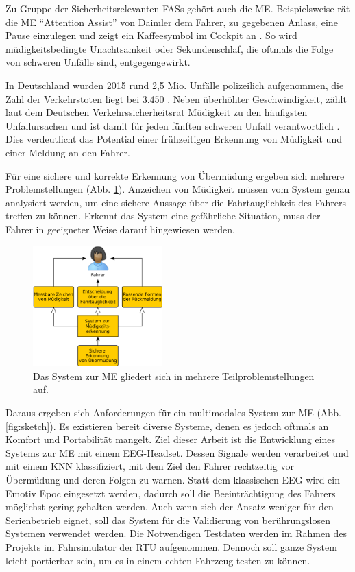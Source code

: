 {Zu Gruppe der Sicherheitsrelevanten \acl{FASs} gehört auch die \acl{ME}. Beispielsweise rät die \acl{ME} "`Attention Assist"' von Daimler dem Fahrer, zu gegebenen Anlass, eine Pause einzulegen und zeigt ein Kaffeesymbol im Cockpit an \cite{Daimler}. So wird müdigkeitsbedingte Unachtsamkeit oder Sekundenschlaf, die oftmals die Folge von schweren Unfälle sind, entgegengewirkt.

In Deutschland wurden 2015 rund 2,5 Mio. Unfälle polizeilich aufgenommen, die Zahl der Verkehrstoten liegt bei 3.450 \cite{accident_statistic}. Neben überhöhter Geschwindigkeit, zählt laut dem Deutschen Verkehrssicherheitsrat Müdigkeit zu den häufigsten Unfallursachen und ist damit für jeden fünften schweren Unfall verantwortlich \cite{dvr_statistic}. Dies verdeutlicht das Potential einer frühzeitigen Erkennung von Müdigkeit und einer Meldung an den Fahrer.

Für eine sichere und korrekte Erkennung von Übermüdung ergeben sich mehrere Problemstellungen (Abb. \ref{fig:ddd_problem}). Anzeichen von Müdigkeit müssen vom System genau analysiert werden, um eine sichere Aussage über die Fahrtauglichkeit des Fahrers treffen zu können. Erkennt das System eine gefährliche Situation, muss der Fahrer in geeigneter Weise darauf hingewiesen werden.

\begin{figure}[h] 
  \begin{center}
    \includegraphics[width=5cm]{ddd_problem_detail}
    \caption[Problem]{Das System zur \acl{ME} gliedert sich in mehrere Teilproblemstellungen auf.\label{fig:ddd_problem}}
  \end{center}
\end{figure}

Daraus ergeben sich Anforderungen für ein multimodales System zur \acl{ME}  (Abb. \ref{fig:sketch}). Es existieren bereit diverse Systeme, denen es jedoch oftmals an Komfort und Portabilität mangelt. Ziel dieser Arbeit ist die Entwicklung eines Systems zur \acl{ME} mit einem EEG-Headset. 
Dessen Signale werden verarbeitet und mit einem KNN klassifiziert, mit dem Ziel den Fahrer rechtzeitig vor Übermüdung und deren Folgen zu warnen.
Statt dem klassischen EEG wird ein Emotiv Epoc eingesetzt werden, dadurch  soll die Beeinträchtigung des Fahrers möglichst gering gehalten
werden. Auch wenn sich der Ansatz weniger für den Serienbetrieb eignet, soll das System für die Validierung von berührungslosen Systemen verwendet werden. Die Notwendigen Testdaten werden im Rahmen des Projekts im Fahrsimulator der \acl{RTU} aufgenommen. Dennoch soll ganze System leicht portierbar sein, um es in einem echten Fahrzeug testen zu können.
\\ 

}
